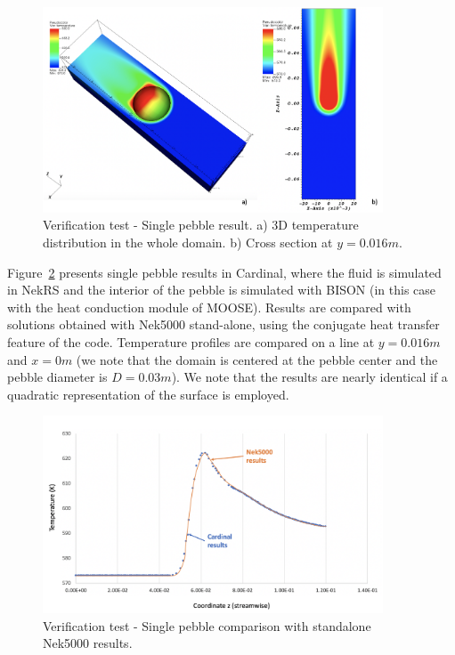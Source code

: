 \begin{figure}[!h]
\centering
\includegraphics[clip=true,width=0.9\textwidth]{Figures/nrs_vv1}
\caption{Verification test - Single pebble result. a) 3D temperature distribution in the whole domain. b) Cross section at $y=0.016 m$.}
\label{f:nrs1}
\end{figure}

Figure~\ref{f:nrs2} presents single pebble results in Cardinal,  where the fluid is simulated in NekRS and the interior of the pebble is simulated with BISON (in this case with the heat conduction module of MOOSE). Results are compared with solutions obtained with Nek5000 stand-alone, using the conjugate heat transfer feature of the code. Temperature profiles are compared on a line at $y=0.016 m$ and $x=0 m$ (we note that the domain is centered at the pebble center and the pebble diameter is $D=0.03 m$). We note that the results are nearly identical if a quadratic representation of the surface is employed.

\begin{figure}[!h]
\centering
\includegraphics[clip=true,width=0.9\textwidth]{Figures/nrs_vv2}
\caption{Verification test - Single pebble comparison with standalone Nek5000 results. }
\label{f:nrs2}
\end{figure}

